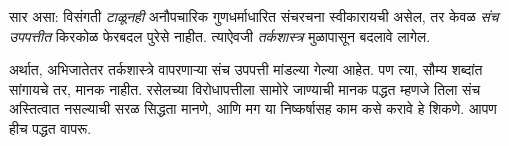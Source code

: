 \documentclass[../../../include/open-logic-section]{subfiles}
\begin{document}
सार असा:
विसंगती
\emph{टाळूनही}
अनौपचारिक
गुणधर्माधारित
संचरचना
स्वीकारायची
असेल, तर
केवळ \emph{संच
उपपत्तीत}
किरकोळ फेरबदल
पुरेसे नाहीत.
त्याऐवजी
\emph{तर्कशास्त्र}
मुळापासून
बदलावे लागेल.

अर्थात,
अभिजातेतर
तर्कशास्त्रे
वापरणाऱ्या
संच उपपत्ती
मांडल्या गेल्या
आहेत. पण
त्या, सौम्य
शब्दांत सांगायचे
तर, मानक
नाहीत.
रसेलच्या
विरोधापत्तीला
सामोरे जाण्याची
मानक पद्धत
म्हणजे तिला
संच अस्तित्वात
नसल्याची
सरळ सिद्धता
मानणे, आणि
मग या निष्कर्षासह
काम कसे करावे
हे शिकणे.
आपण हीच
पद्धत वापरू.
\end{document}

